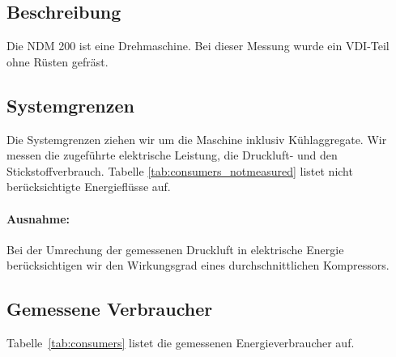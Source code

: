 \documentclass[a4paper,11pt,pdftex,twoside]{scrartcl}
\begin{document}
\subsection{Beschreibung}

Die NDM 200 ist eine Drehmaschine. Bei dieser Messung wurde ein VDI-Teil ohne R\"usten gefr\"ast. 



\subsection{Systemgrenzen}

Die Systemgrenzen ziehen wir um die Maschine inklusiv K\"uhlaggregate. Wir
messen die zugef\"uhrte elektrische Leistung, die Druckluft- und den Stickstoffverbrauch. Tabelle \ref{tab:consumers_notmeasured}
listet nicht ber\"ucksichtigte Energiefl\"usse auf.

\paragraph{Ausnahme:}
Bei der Umrechung der gemessenen Druckluft in elektrische
Energie ber\"ucksichtigen wir den Wirkungsgrad eines durchschnittlichen
Kompressors. 


\pagebreak
\subsection{Gemessene Verbraucher}

Tabelle~\ref{tab:consumers} listet die gemessenen Energieverbraucher auf.
\end{document}
